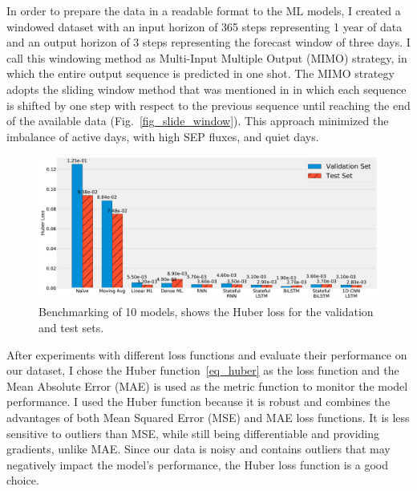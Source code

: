 In order to prepare the data in a readable format to the ML models, I created a windowed dataset with an input horizon of 365 steps representing 1 year of data and an output horizon of 3 steps representing the forecast window of three days. I call this windowing method as Multi-Input Multiple Output (MIMO) strategy, in which the entire output sequence is predicted in one shot. The MIMO strategy adopts the sliding window method that was mentioned in \citet{benson_2020} in which each sequence is shifted by one step with respect to the previous sequence until reaching the end of the available data (Fig.~\ref{fig_slide_window}).
This approach minimized the imbalance of active days, with high SEP fluxes, and quiet days.

\begin{figure}[htp]
	\centering
    \includegraphics[width=\textwidth]{chapter4/figs/models_benchmark.pdf}
    \caption{Benchmarking of 10 models, shows the Huber loss for the validation and test sets.}
\label{fig_benchmark}
\end{figure}

After experiments with different loss functions and evaluate their performance on our dataset, I chose the Huber function~\ref{eq_huber} as the loss function and the Mean Absolute Error (MAE) is used as the metric function to monitor the model performance.
I used the Huber function because it is robust and combines the advantages of both Mean Squared Error (MSE) and MAE loss functions. It is less sensitive to outliers than MSE, while still being differentiable and providing gradients, unlike MAE. Since our data is noisy and contains outliers that may negatively impact the model's performance, the Huber loss function is a good choice.


